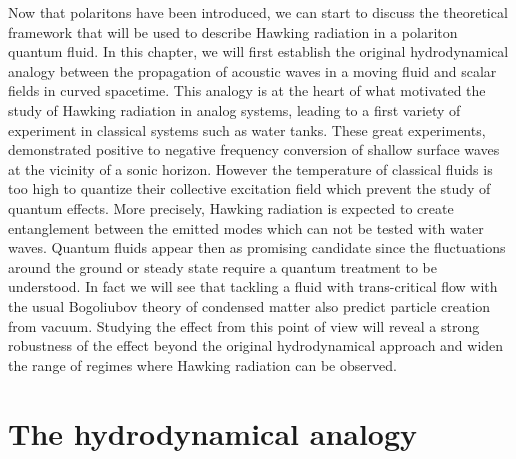 Now that polaritons have been introduced, we can start to discuss the theoretical framework that will be used to 
describe Hawking radiation in a polariton quantum fluid. In this chapter, we will first establish the original hydrodynamical analogy between the propagation 
of acoustic waves in a moving fluid and scalar fields in curved spacetime. This analogy is at the heart of what motivated the study 
of Hawking radiation in analog systems, leading to a first variety of experiment in classical systems such as water tanks. These great experiments,
\cite{rousseaux_observation_2008,weinfurtner_measurement_2011} demonstrated positive to negative frequency conversion of shallow surface waves at the vicinity of a sonic horizon. However the temperature
of classical fluids is too high to quantize their collective excitation field which prevent the study of quantum effects. More precisely, Hawking radiation is expected 
to create entanglement between the emitted modes which can not be tested with water waves. Quantum fluids appear then as promising candidate since the 
fluctuations around the ground or steady state require a quantum treatment to be understood. In fact we will see that tackling a fluid with trans-critical flow with the usual Bogoliubov theory of condensed matter also predict particle creation from vacuum. Studying the effect from this point of view will reveal a strong robustness 
of the effect beyond the original hydrodynamical approach and widen the range of regimes where Hawking radiation can be observed.


\section{The hydrodynamical analogy}


